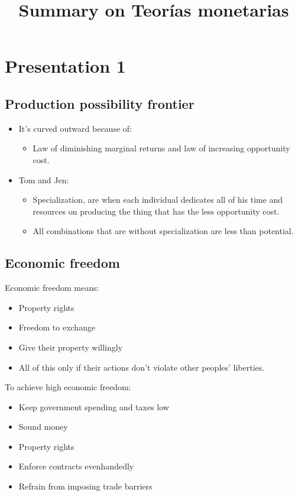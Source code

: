 \documentclass[openany]{book}
\title{Summary on Teorías monetarias}
\begin{document}
\tableofcontents

\chapter{Presentation 1}
\section{Production possibility frontier}
\begin{itemize}
    \item It's curved outward because of: 
        \begin{itemize}
            \item Law of diminishing marginal returns and law of increasing opportunity cost. 
        \end{itemize}
    
    \item Tom and Jen: 
        \begin{itemize}
            \item Specialization, are when each individual dedicates all of his time and resources on producing the thing that has the less opportunity cost. 
            \item All combinations that are without specialization are less than potential. 
        \end{itemize}
\end{itemize}

\section{Economic freedom }
Economic freedom means: 
\begin{itemize}
    \item Property rights 
    \item Freedom to exchange 
    \item Give their property willingly 
    \item All of this only if their actions don't violate other peoples' liberties. 
\end{itemize}
To achieve high economic freedom: 
\begin{itemize}
    \item Keep government spending and taxes low
    \item Sound money 
    \item Property rights 
    \item Enforce contracts evenhandedly 
    \item Refrain from imposing trade barriers 
\end{itemize}
\end{document}
